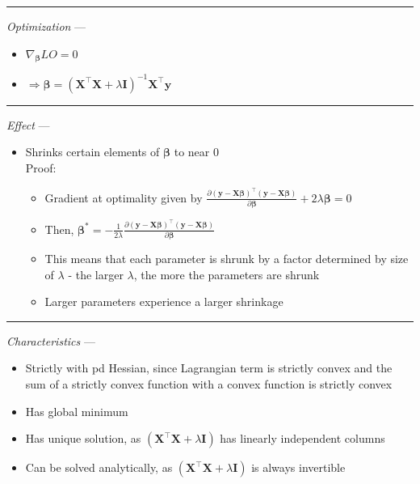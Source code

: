 {\color{lightgray}\hrule height 0.001mm}

\emph{Optimization} ---
\begin{itemize}
    \item $\nabla_{\boldsymbol{\beta}} LO = 0$
    \item $\Rightarrow \boldsymbol{\beta} = (\boldsymbol{X}^\intercal \boldsymbol{X} + \lambda \boldsymbol{I})^{-1}  \boldsymbol{X}^\intercal \boldsymbol{y}$
\end{itemize}

{\color{lightgray}\hrule height 0.001mm}

\emph{Effect} ---
\begin{itemize}
    \item Shrinks certain elements of $\boldsymbol{\beta}$ to near 0\\
    Proof:
    \begin{itemize}
        \item Gradient at optimality given by $\frac{\partial ( \boldsymbol{y} - \boldsymbol{X}\boldsymbol{\beta})^\intercal( \boldsymbol{y} - \boldsymbol{X}\boldsymbol{\beta} )}{\partial \boldsymbol{\beta}} + 2 \lambda \boldsymbol{\beta} = 0$
        \item Then, $\boldsymbol{\beta}^* = -\frac{1}{2 \lambda} \frac{\partial ( \boldsymbol{y} - \boldsymbol{X}\boldsymbol{\beta})^\intercal( \boldsymbol{y} - \boldsymbol{X}\boldsymbol{\beta} )}{\partial \boldsymbol{\beta}}$
        \item This means that each parameter is shrunk by a factor determined by size of $\lambda$ - the larger $\lambda$, the more the parameters are shrunk
        \item Larger parameters experience a larger shrinkage
    \end{itemize}
\end{itemize}

{\color{lightgray}\hrule height 0.001mm}

\emph{Characteristics} --- 
\begin{itemize}
    \item Strictly with pd Hessian, since Lagrangian term is strictly convex and the sum of a strictly convex function with a convex function is strictly convex
    \item Has global minimum
    \item Has unique solution, as $(\boldsymbol{X}^\intercal \boldsymbol{X} + \lambda \boldsymbol{I})$ has linearly independent columns
    \item Can be solved analytically, as $(\boldsymbol{X}^\intercal \boldsymbol{X} + \lambda \boldsymbol{I})$ is always invertible
\end{itemize}

